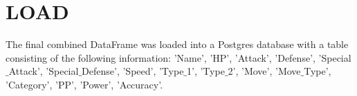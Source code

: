 \documentclass[10pt]{article}
\begin{document}

\section{LOAD}


The final combined DataFrame was loaded into a Postgres database with a table consisting of the following information: 'Name', 'HP', 'Attack', 'Defense', 'Special$\_$Attack', 'Special$\_$Defense', 'Speed', 'Type$\_$1', 'Type$\_$2', 'Move', 'Move$\_$Type', 'Category', 'PP', 'Power', 'Accuracy'.
\end{document}
